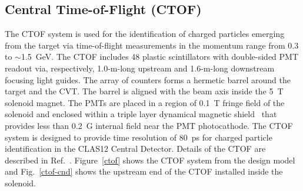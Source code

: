 \documentclass[final,3p,twocolumn]{elsarticle}
\begin{document}
\subsection{Central Time-of-Flight (CTOF)}

The CTOF system is used for the identification of charged particles emerging from the target via time-of-flight
measurements in the momentum range from 0.3 to $\sim$1.5~GeV. The CTOF includes 48 plastic scintillators with
double-sided PMT readout via, respectively, 1.0-m-long upstream and 1.6-m-long downstream focusing light guides.
The array of counters forms a hermetic barrel around the target and the CVT. The barrel is aligned with the beam
axis inside the 5~T solenoid magnet. The PMTs are placed in a region of 0.1~T fringe field of the solenoid and
enclosed within a triple layer dynamical magnetic shield~\cite{Baturin:2012zz} that provides less than 0.2~G
internal field near the PMT photocathode. The CTOF system is designed to provide time resolution of 80~ps for
charged particle identification in the CLAS12 Central Detector. Details of the CTOF are described in
Ref.~\cite{ctof-nim}. Figure~\ref{ctof} shows the CTOF system from the design model and Fig.~\ref{ctof-cnd}
shows the upstream end of the CTOF installed inside the solenoid.
\end{document}
